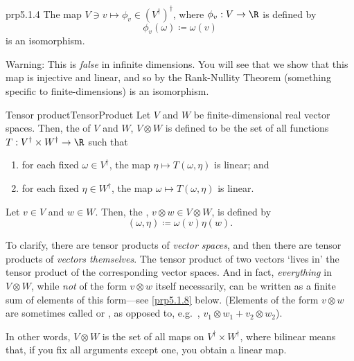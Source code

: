 \begin{prp}{}{prp5.1.4}
The map $V\ni v\mapsto \phi _v\in (V^\dagger )^\dagger$, where $\phi _v:V\rightarrow \R$ is defined by
\begin{equation}
\phi _v(\omega )\coloneqq \omega (v)
\end{equation}
is an isomorphism.
\begin{wrn}
Warning:  This is \emph{false} in infinite dimensions.  You will see that we show that this map is injective and linear, and so by the Rank-Nullity Theorem (something specific to finite-dimensions) is an isomorphism.
\end{wrn}
\end{prp}
\begin{dfn}{Tensor product}{TensorProduct}
Let $V$ and $W$ be finite-dimensional real vector spaces.  Then, the  of $V$ and $W$, $V\otimes W$ is defined to be the set of all functions $T:V^{\dagger}\times W^{\dagger}\rightarrow \R$ such that
\begin{enumerate}
\item for each fixed $\omega \in V^{\dagger}$, the map $\eta \mapsto T(\omega ,\eta )$ is linear; and
\item for each fixed $\eta \in W^{\dagger}$, the map $\omega \mapsto T(\omega ,\eta )$ is linear.
\end{enumerate}
Let $v\in V$ and $w\in W$.  Then, the , $v\otimes w\in V\otimes W$, is defined by
\begin{equation}
[v\otimes w](\omega ,\eta )\coloneqq \omega (v)\eta (w).
\end{equation}
\begin{rmk}
To clarify, there are tensor products of \emph{vector spaces}, and then there are tensor products of \emph{vectors themselves}.  The tensor product of two vectors `lives in' the tensor product of the corresponding vector spaces.  And in fact, \emph{everything} in $V\otimes W$, while \emph{not} of the form $v\otimes w$ itself necessarily, can be written as a finite sum of elements of this form---see \cref{prp5.1.8} below.  (Elements of the form $v\otimes w$ are sometimes called  or , as opposed to, e.g.~, $v_1\otimes w_1+v_2\otimes w_2$).
\end{rmk}
\begin{rmk}
In other words, $V\otimes W$ is the set of all  maps on $V^{\dagger}\times W^{\dagger}$, where bilinear means that, if you fix all arguments except one, you obtain a linear map.

\end{rmk}
\end{dfn}
